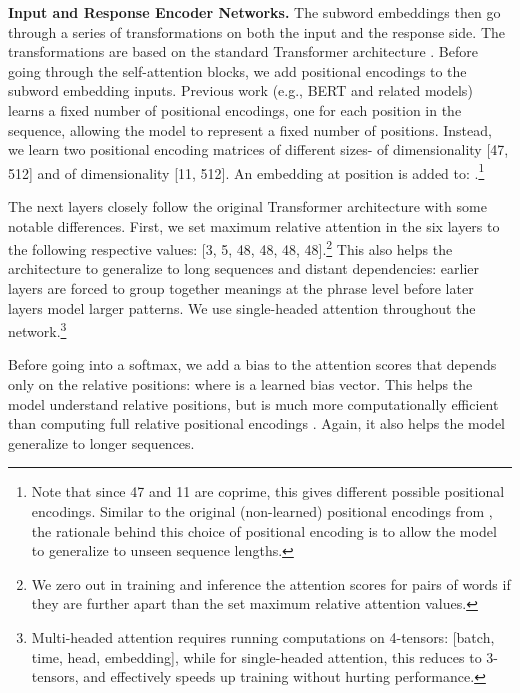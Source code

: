 \documentclass[11pt,a4paper]{article}
\begin{document}
\vspace{1.3mm}
\noindent \textbf{Input and Response Encoder Networks.}
The subword embeddings then go through a series of transformations on both the input and the response side. The transformations are based on the standard Transformer architecture \cite{Vaswani:2017nips}. Before going through the self-attention blocks, we add positional encodings to the subword embedding inputs. Previous work (e.g., BERT and related models) \cite[\textit{inter alia}]{Devlin:2018arxiv,Lan:2019albert} learns a fixed number of positional encodings, one for each position in the sequence, allowing the model to represent a fixed number of positions. Instead, we learn two positional encoding matrices of different sizes-  of dimensionality [47, 512] and  of dimensionality [11, 512]. An embedding at position  is added to: .\footnote{Note that since 47 and 11 are coprime, this gives  different possible positional encodings. Similar to the original (non-learned) positional encodings from , the rationale behind this choice of positional encoding is to allow the model to generalize to unseen sequence lengths.}



The next layers closely follow the original Transformer architecture with some notable differences. First, we set maximum relative attention \cite{Shaw:2018naacl} in the six layers to the following respective values: [3, 5, 48, 48, 48, 48].\footnote{We zero out in training and inference the attention scores for pairs of words if they are further apart than the set maximum relative attention values.} This also helps the architecture to generalize to long sequences and distant dependencies: earlier layers are forced to group together meanings at the phrase level before later layers model larger patterns. We use single-headed attention throughout the network.\footnote{Multi-headed attention requires running computations on 4-tensors: [batch, time, head, embedding], while for single-headed attention, this reduces to 3-tensors, and effectively speeds up training without hurting performance.}

Before going into a softmax, we add a bias to the attention scores that depends only on the relative positions:  where  is a learned bias vector. This helps the model understand relative positions, but is much more computationally efficient than computing full relative positional encodings \cite{Shaw:2018naacl}. Again, it also helps the model generalize to longer sequences.
\end{document}
